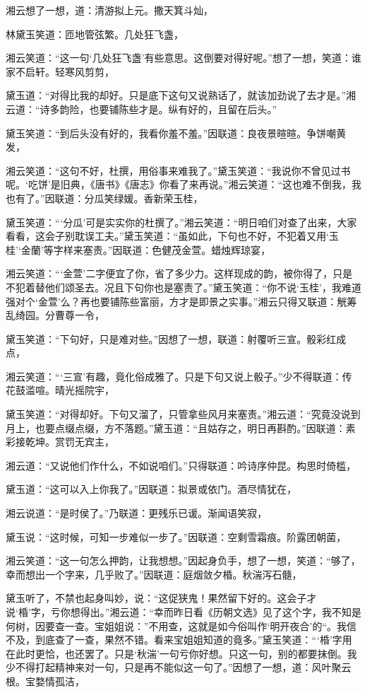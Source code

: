 \documentclass[12pt,oneside]{book}
\begin{document}
湘云想了一想，道：清游拟上元。撒天箕斗灿，

林黛玉笑道：匝地管弦繁。几处狂飞盏，

湘云笑道：“这一句‘几处狂飞盏’有些意思。这倒要对得好呢。”想了一想，笑道：谁家不启轩。轻寒风剪剪，

黛玉道：“对得比我的却好。只是底下这句又说熟话了，就该加劲说了去才是。”湘云道：“诗多韵险，也要铺陈些才是。纵有好的，且留在后头。”

黛玉笑道：“到后头没有好的，我看你羞不羞。”因联道：良夜景暄暄。争饼嘲黄发，

湘云笑道：“这句不好，杜撰，用俗事来难我了。”黛玉笑道：“我说你不曾见过书呢。‘吃饼’是旧典，《唐书》《唐志》你看了来再说。”湘云笑道：“这也难不倒我，我也有了。”因联道：分瓜笑绿媛。香新荣玉桂，

黛玉笑道：“‘分瓜’可是实实你的杜撰了。”湘云笑道：“明日咱们对查了出来，大家看看，这会子别耽误工夫。”黛玉笑道：“虽如此，下句也不好，不犯着又用‘玉桂’‘金蘭’等字样来塞责。”因联道：色健茂金萱。蜡烛辉琼宴，

湘云笑道：“‘金萱’二字便宜了你，省了多少力。这样现成的韵，被你得了，只是不犯着替他们颂圣去。况且下句你也是塞责了。”黛玉笑道：“你不说‘玉桂’，我难道强对个‘金萱’么？再也要铺陈些富丽，方才是即景之实事。”湘云只得又联道：觥筹乱绮园。分曹尊一令，

黛玉笑道：“下句好，只是难对些。”因想了一想，联道：射覆听三宣。骰彩红成点，

湘云笑道：“‘三宣’有趣，竟化俗成雅了。只是下句又说上骰子。”少不得联道：传花鼓滥喧。晴光摇院宇，

黛玉笑道：“对得却好。下句又溜了，只管拿些风月来塞责。”湘云道：“究竟没说到月上，也要点缀点缀，方不落题。”黛玉道：“且姑存之，明日再斟酌。”因联道：素彩接乾坤。赏罚无宾主，

湘云道：“又说他们作什么，不如说咱们。”只得联道：吟诗序仲昆。构思时倚槛，

黛玉道：“这可以入上你我了。”因联道：拟景或依门。酒尽情犹在，

湘云说道：“是时侯了。”乃联道：更残乐已谖。渐闻语笑寂，

黛玉说：“这时候，可知一步难似一步了。”因联道：空剩雪霜痕。阶露团朝菌，

湘云笑道：“这一句怎么押韵，让我想想。”因起身负手，想了一想，笑道：“够了，幸而想出一个字来，几乎败了。”因联道：庭烟敛夕棔。秋湍泻石髓，

黛玉听了，不禁也起身叫妙，说：“这促狭鬼！果然留下好的。这会子才说‘棔’字，亏你想得出。”湘云道：“幸而昨日看《历朝文选》见了这个字，我不知是何树，因要查一查。宝姐姐说：”不用查，这就是如今俗叫作‘明开夜合’的“。我信不及，到底查了一查，果然不错。看来宝姐姐知道的竟多。”黛玉笑道：“‘棔’字用在此时更恰，也还罢了。只是‘秋湍’一句亏你好想。只这一句，别的都要抹倒。我少不得打起精神来对一句，只是再不能似这一句了。”因想了一想，道：风叶聚云根。宝婺情孤洁，
\end{document}
